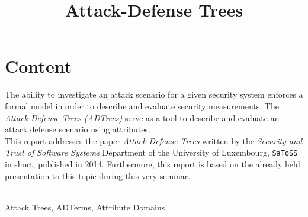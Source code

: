 \documentclass[conference]{IEEEtran}
\begin{document}
\title{Attack-Defense Trees}

\author{
}

\maketitle

\section*{Content}
The ability to investigate an attack scenario for a given security system enforces a formal model in order to describe and evaluate security measurements. The \textit{Attack Defense Trees (ADTrees)} serve as a tool to describe and evaluate an attack defense scenario using attributes. \\
This report addresses the paper \textit{Attack-Defense Trees} written by the \textit{Security and Trust of Software Systems} Department of the University of Luxembourg, \texttt{SaToSS} in short, published in 2014. \cite{dblp} Furthermore, this report is based on the already held presentation to this topic during this very seminar.
\\\\
\begin{IEEEkeywords}
Attack Trees, ADTerms, Attribute Domains
\end{IEEEkeywords}
\end{document}
